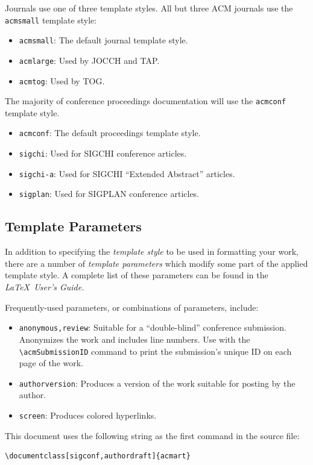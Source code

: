 \documentclass[manuscript,screen,review]{acmart}
\theoremstyle{definition}
\begin{document}
Journals use one of three template styles. All but three ACM journals
use the {\verb|acmsmall|} template style:
\begin{itemize}
	\item {\verb|acmsmall|}: The default journal template style.
	\item {\verb|acmlarge|}: Used by JOCCH and TAP.
	\item {\verb|acmtog|}: Used by TOG.
\end{itemize}

The majority of conference proceedings documentation will use the {\verb|acmconf|} template style.
\begin{itemize}
	\item {\verb|acmconf|}: The default proceedings template style.
	      \item{\verb|sigchi|}: Used for SIGCHI conference articles.
	      \item{\verb|sigchi-a|}: Used for SIGCHI ``Extended Abstract'' articles.
	      \item{\verb|sigplan|}: Used for SIGPLAN conference articles.
\end{itemize}

\subsection{Template Parameters}

In addition to specifying the {\itshape template style} to be used in
formatting your work, there are a number of {\itshape template parameters}
which modify some part of the applied template style. A complete list
of these parameters can be found in the {\itshape \LaTeX\ User's Guide.}

Frequently-used parameters, or combinations of parameters, include:
\begin{itemize}
	\item {\verb|anonymous,review|}: Suitable for a ``double-blind''
	      conference submission. Anonymizes the work and includes line
	      numbers. Use with the \verb|\acmSubmissionID| command to print the
	      submission's unique ID on each page of the work.
	      \item{\verb|authorversion|}: Produces a version of the work suitable
	      for posting by the author.
	      \item{\verb|screen|}: Produces colored hyperlinks.
\end{itemize}

This document uses the following string as the first command in the
source file:
\begin{verbatim}
\documentclass[sigconf,authordraft]{acmart}
\end{verbatim}
\end{document}
